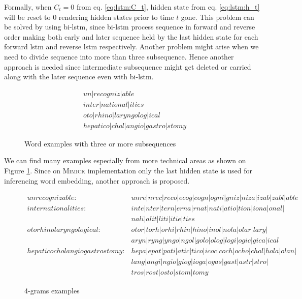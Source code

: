 Formally, when $C_t = 0$ from eq. \ref{eq:lstm:C_t}, hidden state from
eq. \ref{eq:lstm:h_t} will be reset to $0$ rendering hidden states
prior to time $t$ gone. This problem can be solved by using bi-lstm,
since bi-lstm process sequence in forward and reverse order making
both early and later sequence held by the last hidden state for each
forward lstm and reverse lstm respectively. Another problem might
arise when we need to divide sequence into more than three
subsequence. Hence another approach is needed since intermediate
subsequence might get deleted or carried along with the later sequence
even with bi-lstm.
\begin{figure}
    \label{fig:subsequence}
    \begin{align*}
        &un \vert recogniz \vert able \\
        &inter \vert national \vert ities \\
        &oto \vert rhino \vert laryngolog \vert ical \\
        &hepatico \vert chol \vert angio \vert gastro \vert stomy
    \end{align*}
    \caption{Word examples with three or more subsequences}
\end{figure}
We can find many examples especially from more technical areas as
shown on Figure \ref{fig:subsequence}. Since on \textsc{Mimick}
\cite{mimicking2017Pinter} implementation only the last hidden state
is used for inferencing word embedding, another approach is proposed.

\begin{figure}
    \label{fig:4grams}
    \begin{align*}
        unrecognizable : &unre \vert nrec \vert reco \vert ecog \vert cogn \vert ogni \vert gniz \vert niza \vert izab \vert zabl \vert able\\
        internationalities : &inte \vert nter \vert tern \vert erna \vert rnat \vert nati \vert atio \vert tion \vert iona \vert onal \vert \\
        &nali \vert alit \vert liti \vert itie \vert ties\\
        otorhinolaryngological : &otor \vert torh \vert orhi \vert rhin \vert hino \vert inol \vert nola \vert olar \vert lary \vert \\
        &aryn \vert ryng \vert yngo \vert ngol \vert golo \vert olog \vert logi \vert ogic \vert gica \vert ical\\
        hepaticocholangiogastrostomy : &hepa \vert epat \vert pati \vert atic \vert tico \vert icoc \vert coch \vert ocho \vert chol \vert hola \vert olan \vert\\
        &lang \vert angi \vert ngio \vert giog \vert ioga \vert ogas \vert gast \vert astr \vert stro \vert\\
        &tros \vert rost \vert osto \vert stom \vert tomy
    \end{align*}
    \caption{4-grams examples}
\end{figure}

